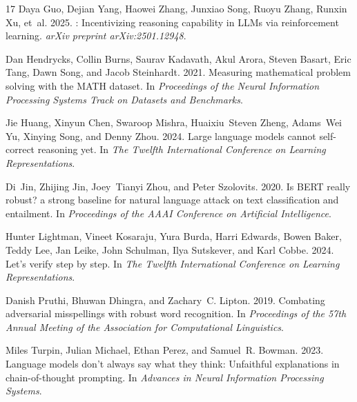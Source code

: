 \documentclass[11pt]{article} %
\begin{document}
\begin{thebibliography}{17}
Daya Guo, Dejian Yang, Haowei Zhang, Junxiao Song, Ruoyu Zhang, Runxin Xu,
  et~al. 2025.
: Incentivizing reasoning capability in {LLM}s via
  reinforcement learning.
\newblock \emph{arXiv preprint arXiv:2501.12948}.

Dan Hendrycks, Collin Burns, Saurav Kadavath, Akul Arora, Steven Basart, Eric
  Tang, Dawn Song, and Jacob Steinhardt. 2021.
\newblock Measuring mathematical problem solving with the {MATH} dataset.
\newblock In \emph{Proceedings of the Neural Information Processing Systems
  Track on Datasets and Benchmarks}.

Jie Huang, Xinyun Chen, Swaroop Mishra, Huaixiu~Steven Zheng, Adams~Wei Yu,
  Xinying Song, and Denny Zhou. 2024.
\newblock Large language models cannot self-correct reasoning yet.
\newblock In \emph{The Twelfth International Conference on Learning
  Representations}.

Di~Jin, Zhijing Jin, Joey~Tianyi Zhou, and Peter Szolovits. 2020.
\newblock Is {BERT} really robust? a strong baseline for natural language
  attack on text classification and entailment.
\newblock In \emph{Proceedings of the AAAI Conference on Artificial
  Intelligence}.

Hunter Lightman, Vineet Kosaraju, Yura Burda, Harri Edwards, Bowen Baker, Teddy
  Lee, Jan Leike, John Schulman, Ilya Sutskever, and Karl Cobbe. 2024.
\newblock Let's verify step by step.
\newblock In \emph{The Twelfth International Conference on Learning
  Representations}.

Danish Pruthi, Bhuwan Dhingra, and Zachary~C. Lipton. 2019.
\newblock Combating adversarial misspellings with robust word recognition.
\newblock In \emph{Proceedings of the 57th Annual Meeting of the Association
  for Computational Linguistics}.

Miles Turpin, Julian Michael, Ethan Perez, and Samuel~R. Bowman. 2023.
\newblock Language models don't always say what they think: Unfaithful
  explanations in chain-of-thought prompting.
\newblock In \emph{Advances in Neural Information Processing Systems}.


\end{thebibliography}
\end{document}
